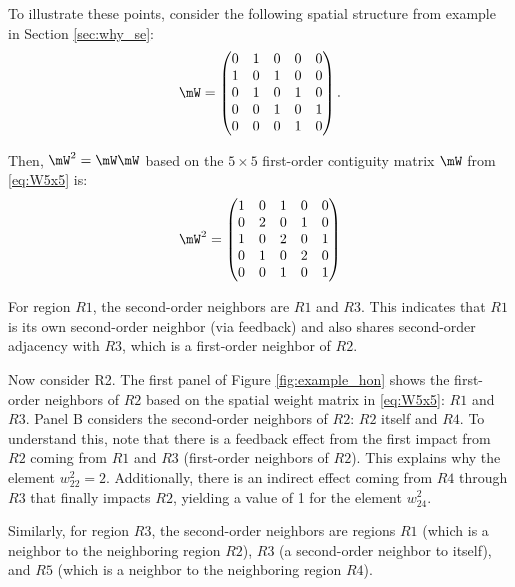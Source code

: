 To illustrate these points, consider the following spatial structure from example in Section \ref{sec:why_se}:
\begin{equation}\label{eq:W5x5}
\mW = \begin{pmatrix}
      0 & 1 & 0 & 0 & 0 \\
      1 & 0 & 1 & 0 & 0 \\
      0 & 1 & 0 & 1 & 0 \\
      0 & 0 & 1 & 0 & 1 \\
      0 & 0 & 0 & 1 & 0
      \end{pmatrix}.
\end{equation}

Then, $\mW^2 = \mW\mW$ based on the $5\times 5$ first-order contiguity matrix $\mW$ from \eqref{eq:W5x5} is:
\begin{equation}
\mW^2 = \begin{pmatrix}\label{eq:W25x5}
      1 & 0 & 1 & 0 & 0 \\
      0 & 2 & 0 & 1 & 0 \\
      1 & 0 & 2 & 0 & 1 \\
      0 & 1 & 0 & 2 & 0 \\
      0 & 0 & 1 & 0 & 1
      \end{pmatrix}
\end{equation}

For region $R1$, the second-order neighbors are $R1$ and $R3$. This indicates that $R1$ is its own second-order neighbor (via feedback) and also shares second-order adjacency with $R3$, which is a first-order neighbor of $R2$. 

Now consider R2. The first panel of Figure \ref{fig:example_hon} shows the first-order neighbors of $R2$ based on the spatial weight matrix in \eqref{eq:W5x5}: $R1$ and $R3$. Panel B considers the second-order neighbors of $R2$: $R2$ itself and $R4$. To understand this, note that there is a feedback effect from the first impact from $R2$ coming from $R1$ and $R3$ (first-order neighbors of $R2$). This explains why the element $w^2_{22} = 2$. Additionally, there is an indirect effect coming from $R4$ through $R3$ that finally impacts $R2$, yielding a value of 1 for the element $w^2_{24}$.

Similarly, for region $R3$, the second-order neighbors are regions $R1$ (which is a neighbor to the neighboring region $R2$), $R3$ (a second-order neighbor to itself), and $R5$ (which is a neighbor to the neighboring region $R4$). 

